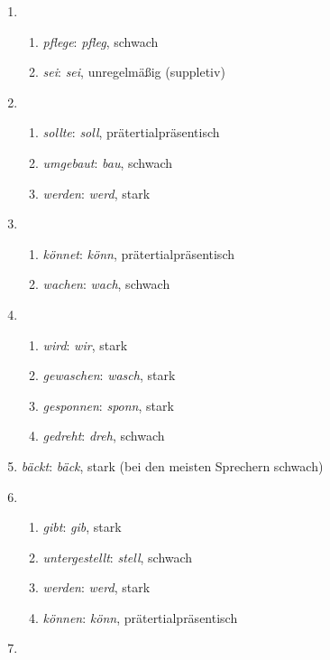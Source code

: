 \label{sol:verbalflexion04}

\begin{enumerate}
  \item
    \begin{enumerate}
      \item \textit{pflege}: \textit{pfleg}, schwach
      \item \textit{sei}: \textit{sei}, unregelmäßig (suppletiv)
    \end{enumerate}
  \item
    \begin{enumerate}
      \item \textit{sollte}: \textit{soll}, prätertialpräsentisch
      \item \textit{umgebaut}: \textit{bau}, schwach
      \item \textit{werden}: \textit{werd}, stark
    \end{enumerate}
  \item
    \begin{enumerate}
      \item \textit{könnet}: \textit{könn}, prätertialpräsentisch
      \item \textit{wachen}: \textit{wach}, schwach
    \end{enumerate}
  \item
    \begin{enumerate}
      \item \textit{wird}: \textit{wir}, stark
      \item \textit{gewaschen}: \textit{wasch}, stark
      \item \textit{gesponnen}: \textit{sponn}, stark
      \item \textit{gedreht}: \textit{dreh}, schwach
    \end{enumerate}
  \item \textit{bäckt}: \textit{bäck}, stark (bei den meisten Sprechern schwach)
  \item
    \begin{enumerate}
      \item \textit{gibt}: \textit{gib}, stark
      \item \textit{untergestellt}: \textit{stell}, schwach
      \item \textit{werden}: \textit{werd}, stark
      \item \textit{können}: \textit{könn}, prätertialpräsentisch
    \end{enumerate}
  \item

\end{enumerate}
